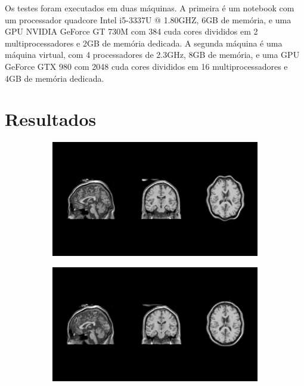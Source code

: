   Os testes foram executados em duas máquinas. A primeira é um notebook com
um processador quadcore Intel i5-3337U @ 1.80GHZ, 6GB de memória, e uma GPU
NVIDIA GeForce GT 730M com 384 cuda cores divididos em 2 multiprocessadores e
2GB de memória dedicada. A segunda máquina é uma máquina virtual, com 4
processadores de 2.3GHz, 8GB de memória, e uma GPU GeForce GTX 980 com 2048
cuda cores divididos em 16 multiprocessadores e 4GB de memória dedicada.

\section{Resultados}

\begin{figure}[H]
    \centering
    \begin{subfigure}[t]{0.5\textwidth}
      \includegraphics[width=\textwidth]{figuras/result001.png}
      \label{fig:unequalizedImage}
    \end{subfigure}
    \begin{subfigure}[t]{0.5\textwidth}
      \includegraphics[width=\textwidth]{figuras/result002.png}

\end{subfigure}
\end{figure}
